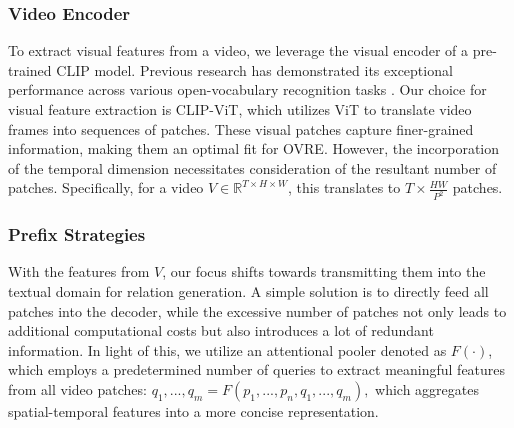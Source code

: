 \documentclass[letterpaper]{article}
\begin{document}
\subsubsection{Video Encoder}
To extract visual features from a video, we leverage the visual encoder of a pre-trained CLIP \cite{radford2021learning} model.
Previous research has demonstrated its exceptional performance across various open-vocabulary recognition tasks \cite{ni2022expanding,tang2021clip4caption,luo2022clip4clip}. 
Our choice for visual feature extraction is CLIP-ViT, which utilizes ViT\cite{dosovitskiy2020image} to translate video frames into sequences of patches. These visual patches capture finer-grained information, making them an optimal fit for OVRE. However, the incorporation of the temporal dimension necessitates consideration of the resultant number of patches. Specifically, for a video $V\in \mathbb{R}^{T\times H\times W}$, this translates to $T\times\frac{HW}{P^{2}}$ patches.
\subsubsection{Prefix Strategies}
With the features from $V$, our focus shifts towards transmitting them into the textual domain for relation generation. A simple solution is to directly feed all patches into the decoder, while the excessive number of patches not only leads to additional computational costs but also introduces a lot of redundant information.
In light of this, we utilize an attentional pooler denoted as $F(\cdot)$, which employs a predetermined number of queries to extract meaningful features from all video patches:
$
q_1,...,q_m=F(p_1,...,p_n,q_1,...,q_m),
$
which aggregates spatial-temporal features into a more concise representation. 
\end{document}
